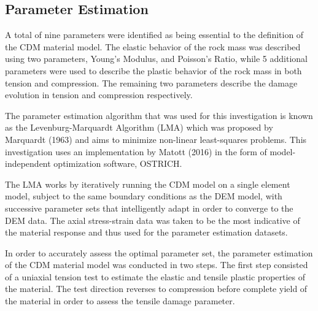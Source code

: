 \subsection{Parameter Estimation}
A total of nine parameters were identified as being essential to the definition of the CDM material model. The elastic behavior of the rock mass was described using two parameters, Young’s Modulus, and Poisson’s Ratio, while 5 additional parameters were used to describe the plastic behavior of the rock mass in both tension and compression. The remaining two parameters describe the damage evolution in tension and compression respectively. 

The parameter estimation algorithm that was used for this investigation is known as the Levenburg-Marquardt Algorithm (LMA) which was proposed by Marquardt (1963) and aims to minimize non-linear least-squares problems. This investigation uses an implementation by Matott (2016) in the form of model-independent optimization software, OSTRICH.

The LMA works by iteratively running the CDM model on a single element model, subject to the same boundary conditions as the DEM model, with successive parameter sets that intelligently adapt in order to converge to the DEM data. The axial stress-strain data was taken to be the most indicative of the material response and thus used for the parameter estimation datasets.

In order to accurately assess the optimal parameter set, the parameter estimation of the CDM material model was conducted in two steps. The first step consisted of a uniaxial tension test to estimate the elastic and tensile plastic properties of the material. The test direction reverses to compression before complete yield of the material in order to assess the tensile damage parameter. 

